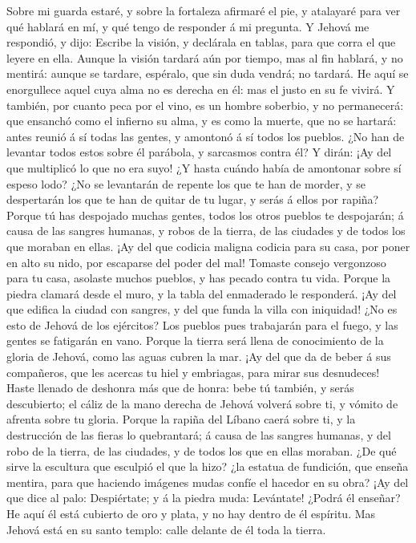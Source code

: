  Sobre mi guarda estaré, y sobre la fortaleza afirmaré el
pie, y atalayaré para ver qué hablará en mí, y qué tengo de responder á
mi pregunta.  Y Jehová me respondió, y dijo: Escribe la
visión, y declárala en tablas, para que corra el que leyere en ella.
 Aunque la visión tardará aún por tiempo, mas al fin
hablará, y no mentirá: aunque se tardare, espéralo, que sin duda vendrá;
no tardará.  He aquí se enorgullece aquel cuya alma no es
derecha en él: mas el justo en su fe vivirá.  Y también, por
cuanto peca por el vino, es un hombre soberbio, y no permanecerá: que
ensanchó como el infierno su alma, y es como la muerte, que no se
hartará: antes reunió á sí todas las gentes, y amontonó á sí todos los
pueblos.  ¿No han de levantar todos estos sobre él parábola,
y sarcasmos contra él? Y dirán: ¡Ay del que multiplicó lo que no era
suyo! ¿Y hasta cuándo había de amontonar sobre sí espeso lodo?
 ¿No se levantarán de repente los que te han de morder, y se
despertarán los que te han de quitar de tu lugar, y serás á ellos por
rapiña?  Porque tú has despojado muchas gentes, todos los
otros pueblos te despojarán; á causa de las sangres humanas, y robos de
la tierra, de las ciudades y de todos los que moraban en ellas.
 ¡Ay del que codicia maligna codicia para su casa, por poner
en alto su nido, por escaparse del poder del mal!  Tomaste
consejo vergonzoso para tu casa, asolaste muchos pueblos, y has pecado
contra tu vida.  Porque la piedra clamará desde el muro, y
la tabla del enmaderado le responderá.  ¡Ay del que edifica
la ciudad con sangres, y del que funda la villa con iniquidad!
 ¿No es esto de Jehová de los ejércitos? Los pueblos pues
trabajarán para el fuego, y las gentes se fatigarán en vano.
 Porque la tierra será llena de conocimiento de la gloria
de Jehová, como las aguas cubren la mar.  ¡Ay del que da de
beber á sus compañeros, que les acercas tu hiel y embriagas, para mirar
sus desnudeces!  Haste llenado de deshonra más que de
honra: bebe tú también, y serás descubierto; el cáliz de la mano derecha
de Jehová volverá sobre ti, y vómito de afrenta sobre tu gloria.
 Porque la rapiña del Líbano caerá sobre ti, y la
destrucción de las fieras lo quebrantará; á causa de las sangres
humanas, y del robo de la tierra, de las ciudades, y de todos los que en
ellas moraban.  ¿De qué sirve la escultura que esculpió el
que la hizo? ¿la estatua de fundición, que enseña mentira, para que
haciendo imágenes mudas confíe el hacedor en su obra?  ¡Ay
del que dice al palo: Despiértate; y á la piedra muda: Levántate! ¿Podrá
él enseñar? He aquí él está cubierto de oro y plata, y no hay dentro de
él espíritu.  Mas Jehová está en su santo templo: calle
delante de él toda la tierra.

